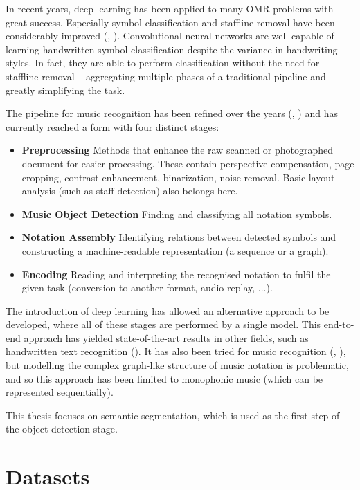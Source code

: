 In recent years, deep learning has been applied to many OMR problems with great success. Especially symbol classification and staffline removal have been considerably improved (\cite{StafflineDetection}, \cite{PachaClassification}). Convolutional neural networks are well capable of learning handwritten symbol classification despite the variance in handwriting styles. In fact, they are able to perform classification without the need for staffline removal -- aggregating multiple phases of a traditional pipeline and greatly simplifying the task.

The pipeline for music recognition has been refined over the years (\cite{BainbridgeBell}, \cite{RebeloSota}) and has currently reached a form with four distinct stages:

\begin{itemize}
    \item \textbf{Preprocessing} Methods that enhance the raw scanned or photographed document for easier processing. These contain perspective compensation, page cropping, contrast enhancement, binarization, noise removal. Basic layout analysis (such as staff detection) also belongs here.
    \item \textbf{Music Object Detection} Finding and classifying all notation symbols.
    \item \textbf{Notation Assembly} Identifying relations between detected symbols and constructing a machine-readable representation (a sequence or a graph).
    \item \textbf{Encoding} Reading and interpreting the recognised notation to fulfil the given task (conversion to another format, audio replay, ...).
\end{itemize}

The introduction of deep learning has allowed an alternative approach to be developed, where all of these stages are performed by a single model. This end-to-end approach has yielded state-of-the-art results in other fields, such as handwritten text recognition (\cite{Scheidl}). It has also been tried for music recognition (\cite{Primus}, \cite{Mayer}), but modelling the complex graph-like structure of music notation is problematic, and so this approach has been limited to monophonic music (which can be represented sequentially).

This thesis focuses on semantic segmentation, which is used as the first step of the object detection stage.


\section{Datasets}
\label{sec:Datasets}


